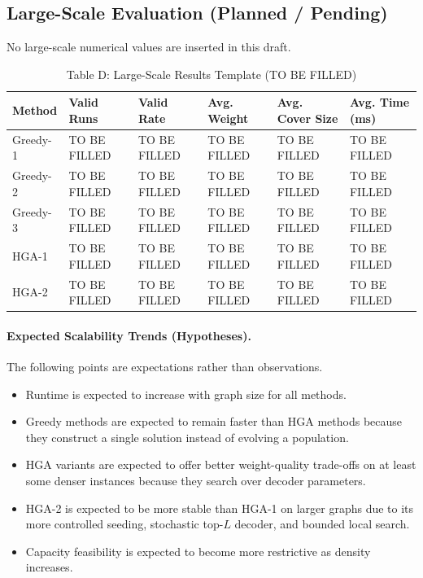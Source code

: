 \documentclass[11pt]{article}
\begin{document}
\subsection{Large-Scale Evaluation (Planned / Pending)}

No large-scale numerical values are inserted in this draft.

\begin{table}[h]
\centering
\caption{Table D: Large-Scale Results Template (TO BE FILLED)}
\label{tab:large-results}
\begin{tabular}{llllll}
\toprule
Method & Valid Runs & Valid Rate & Avg. Weight & Avg. Cover Size & Avg. Time (ms) \\
\midrule
Greedy-1 & TO BE FILLED & TO BE FILLED & TO BE FILLED & TO BE FILLED & TO BE FILLED \\
Greedy-2 & TO BE FILLED & TO BE FILLED & TO BE FILLED & TO BE FILLED & TO BE FILLED \\
Greedy-3 & TO BE FILLED & TO BE FILLED & TO BE FILLED & TO BE FILLED & TO BE FILLED \\
HGA-1 & TO BE FILLED & TO BE FILLED & TO BE FILLED & TO BE FILLED & TO BE FILLED \\
HGA-2 & TO BE FILLED & TO BE FILLED & TO BE FILLED & TO BE FILLED & TO BE FILLED \\
\bottomrule
\end{tabular}
\end{table}

\paragraph{Expected Scalability Trends (Hypotheses).}
The following points are expectations rather than observations.
\begin{itemize}
    \item Runtime is expected to increase with graph size for all methods.
    \item Greedy methods are expected to remain faster than HGA methods because they construct a single solution instead of evolving a population.
    \item HGA variants are expected to offer better weight-quality trade-offs on at least some denser instances because they search over decoder parameters.
    \item HGA-2 is expected to be more stable than HGA-1 on larger graphs due to its more controlled seeding, stochastic top-\(L\) decoder, and bounded local search.
    \item Capacity feasibility is expected to become more restrictive as density increases.
\end{itemize}
\end{document}
